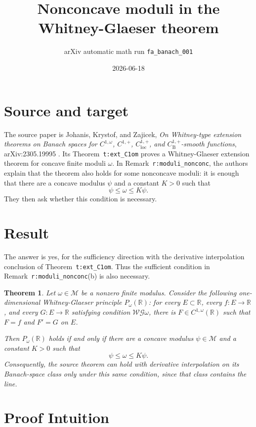 \documentclass[11pt]{article}
\title{Nonconcave moduli in the Whitney-Glaeser theorem}
\author{arXiv automatic math run \texttt{fa\_banach\_001}}
\date{2026-06-18}
\newtheorem{theorem}{Theorem}
\newcommand{\R}{\mathbb R}
\begin{document}
\maketitle

\section*{Source and target}

The source paper is Johanis, Krystof, and Zajicek,
\emph{On Whitney-type extension theorems on Banach spaces for
\(C^{1,\omega}\), \(C^{1,+}\), \(C_{\mathrm{loc}}^{1,+}\), and
\(C_{\mathrm B}^{1,+}\)-smooth functions}, arXiv:2305.19995
\cite{JKZ2305}.  Its Theorem~\texttt{t:ext\_C1om} proves a
Whitney-Glaeser extension theorem for concave finite moduli \(\omega\).  In
Remark~\texttt{r:moduli\_nonconc}, the authors explain that the theorem also
holds for some nonconcave moduli: it is enough that there are a concave
modulus \(\psi\) and a constant \(K>0\) such that
\[
        \psi\leq \omega\leq K\psi .
\]
They then ask whether this condition is necessary.

\section*{Result}

The answer is yes, for the sufficiency direction with the derivative
interpolation conclusion of Theorem~\texttt{t:ext\_C1om}.  Thus the sufficient
condition in Remark~\texttt{r:moduli\_nonconc}(b) is also necessary.

\begin{theorem}
\label{thm:main}
Let \(\omega\in\mathcal M\) be a nonzero finite modulus.  Consider the
following one-dimensional Whitney-Glaeser principle \(P_\omega(\R)\): for
every \(E\subset\R\), every \(f:E\to\R\), and every \(G:E\to\R\) satisfying
condition \(\mathcal{W G}\omega\), there is \(F\in C^{1,\omega}(\R)\) such
that \(F=f\) and \(F'=G\) on \(E\).

Then \(P_\omega(\R)\) holds if and only if there are a concave modulus
\(\psi\in\mathcal M\) and a constant \(K>0\) such that
\[
        \psi\leq \omega\leq K\psi .
\]
Consequently, the source theorem can hold with derivative interpolation on its
Banach-space class only under this same condition, since that class contains
the line.
\end{theorem}

\section*{Proof Intuition}
\end{document}
